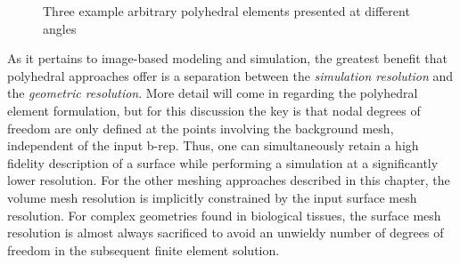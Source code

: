 \begin{figure}[htbp!]
{\label{fig:zoom5}}		
\caption{Three example arbitrary polyhedral elements presented at different angles}
\label{fig:zoom}
\end{figure}

As it pertains to image-based modeling and simulation, the greatest benefit that polyhedral approaches offer is a separation between the \textit{simulation resolution} and the \textit{geometric resolution}. More detail will come in  regarding the polyhedral element formulation, but for this discussion the key is that nodal degrees of freedom are only defined at the points involving the background mesh, independent of the input b-rep. Thus, one can simultaneously retain a high fidelity description of a surface while performing a simulation at a significantly lower resolution. For the other meshing approaches described in this chapter, the volume mesh resolution is implicitly constrained by the input surface mesh resolution. For complex geometries found in biological tissues, the surface mesh resolution is almost always sacrificed to avoid an unwieldy number of degrees of freedom in the subsequent finite element solution.

